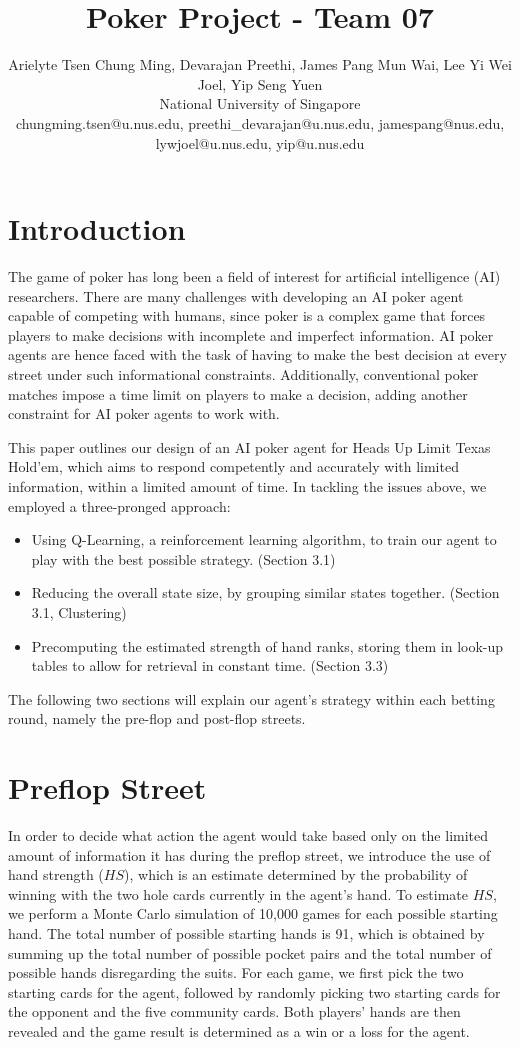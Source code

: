 \documentclass{article}
\title{Poker Project - Team 07}
\author{
Arielyte Tsen Chung Ming, Devarajan Preethi, James Pang Mun Wai, Lee Yi Wei Joel, Yip Seng Yuen
\\ 
National University of Singapore\\
%
chungming.tsen@u.nus.edu, preethi\_devarajan@u.nus.edu, jamespang@nus.edu, lywjoel@u.nus.edu, yip@u.nus.edu
}
\begin{document}
\maketitle

\section{Introduction}

The game of poker has long been a field of interest for artificial intelligence (AI) researchers. There are many challenges with developing an AI poker agent capable of competing with humans, since poker is a complex game that forces players to make decisions with incomplete and imperfect information. AI poker agents are hence faced with the task of having to make the best decision at every street under such informational constraints. Additionally, conventional poker matches impose a time limit on players to make a decision, adding another constraint for AI poker agents to work with.

This paper outlines our design of an AI poker agent for Heads Up Limit Texas Hold’em, which aims to respond competently and accurately with limited information, within a limited amount of time. In tackling the issues above, we employed a three-pronged approach:

\begin{itemize}
  \item Using Q-Learning, a reinforcement learning algorithm, to train our agent to play with the best possible strategy. (Section 3.1)
  \item Reducing the overall state size, by grouping similar states together. (Section 3.1, Clustering)
  \item Precomputing the estimated strength of hand ranks, storing them in look-up tables to allow for retrieval in constant time. (Section 3.3)
 \end{itemize}

The following two sections will explain our agent’s strategy within each betting round, namely the pre-flop and post-flop streets.

\section{Preflop Street}

In order to decide what action the agent would take based only on the limited amount of information it has during the preflop street, we introduce the use of hand strength ($HS$), which is an estimate determined by the probability of winning with the two hole cards currently in the agent’s hand.
To estimate $HS$, we perform a Monte Carlo simulation of 10,000 games for each possible starting hand. The total number of possible starting hands is 91, which is obtained by summing up the total number of possible pocket pairs and the total number of possible hands disregarding the suits. For each game, we first pick the two starting cards for the agent, followed by randomly picking two starting cards for the opponent and the five community cards. Both players’ hands are then revealed and the game result is determined as a win or a loss for the agent.
\end{document}
